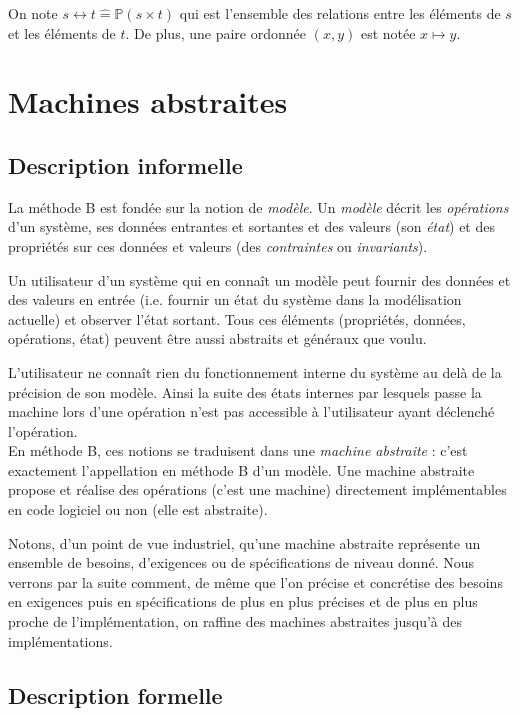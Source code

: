 \documentclass[10pt,a4paper]{article}
\newcommand{\Bequal}{\mathrel{\widehat{=}}}
\begin{document}
On note  $ s \leftrightarrow t \Bequal \mathbb{P}(s \times t)$ qui est l'ensemble des relations entre les éléments de $s$ et les éléments de $t$. De plus, une paire ordonnée $(x, y)$ est notée $x \mapsto y$.

\section{Machines abstraites}

\subsection{Description informelle}

La méthode B est fondée sur la notion de \emph{modèle}. Un \emph{modèle} décrit les \emph{opérations} d'un système, ses données entrantes et sortantes et des valeurs (son \emph{état}) et des propriétés sur ces données et valeurs (des \emph{contraintes} ou \emph{invariants}).

Un utilisateur d'un système qui en connaît un modèle peut fournir des données et des valeurs en entrée (i.e. fournir un état du système dans la modélisation actuelle) et observer l'état sortant. Tous ces  éléments (propriétés, données, opérations, état) peuvent être aussi abstraits et généraux que voulu.

L'utilisateur ne connaît rien du fonctionnement interne du système au delà de la précision de son modèle. Ainsi la suite des états internes par lesquels passe la machine lors d'une opération n'est pas accessible à l'utilisateur ayant déclenché l'opération.
\\

En méthode B, ces notions se traduisent dans une \emph{machine abstraite} : c'est exactement l'appellation en méthode B d'un modèle. Une machine abstraite propose et réalise des opérations (c'est une machine) directement implémentables en code logiciel ou non (elle est abstraite).

Notons, d'un point de vue industriel, qu'une machine abstraite représente un ensemble de besoins, d'exigences ou de spécifications de niveau donné. Nous verrons par la suite comment, de même que l'on précise et concrétise des besoins en exigences puis en spécifications de plus en plus précises et de plus en plus proche de l'implémentation, on raffine des machines abstraites jusqu'à des implémentations.

\subsection{Description formelle}
\end{document}
